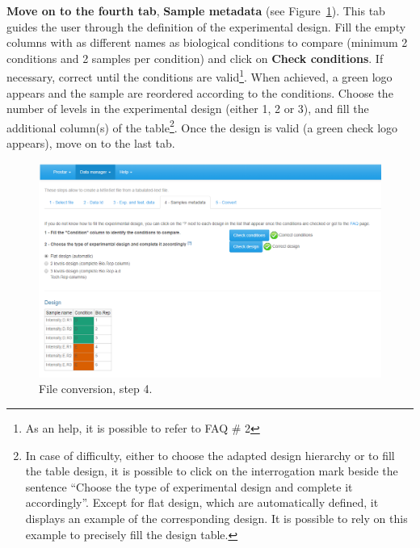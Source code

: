 \documentclass[12pt]{article}
\begin{document}
\textbf{Move on to the fourth tab}, \textbf{Sample metadata} (see Figure~\ref{fig:imp4}). This tab guides the user through the definition of the experimental design.
Fill the empty columns with as different names as biological conditions to compare (minimum 2 conditions and 2 samples per condition) and click on \textbf{Check conditions}. If necessary, correct until the conditions are valid\footnote{As an help, it is possible to refer to FAQ \# 2}. When achieved, a green logo appears and the sample are reordered according to the conditions.
Choose the number of levels in the experimental design (either 1, 2 or 3), and fill the additional column(s) of the table\footnote{In case of difficulty, either to choose the adapted design hierarchy or to fill the table design, it is possible to click on the interrogation mark beside the sentence ``Choose the type of experimental design and complete it accordingly''. Except for flat design, which are automatically defined, it displays an example of the corresponding design. It is possible to rely on this example to precisely fill the design table.}.
Once the design is valid (a green check logo appears), move on to the last tab.

\begin {figure}
\includegraphics[width=\textwidth]{images/convert_sampledata.png}
\caption{File conversion, step 4.}\label{fig:imp4}
\end {figure}
\end{document}
